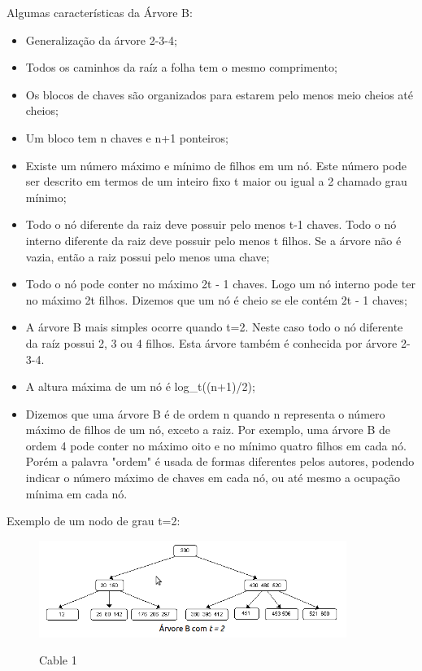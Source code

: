 \documentclass{article}
\begin{document}
Algumas características da Árvore B:

\begin{itemize}
   \item Generalização da árvore 2-3-4;
   \item Todos os caminhos da raíz a folha tem o mesmo comprimento;
   \item Os blocos de chaves são organizados para estarem pelo menos meio cheios até cheios;
   \item Um bloco tem n chaves e n+1 ponteiros;
   \item Existe um número máximo e mínimo de filhos em um nó. Este número pode ser descrito em
termos de um inteiro fixo t maior ou igual a 2 chamado grau mínimo; 
   \item Todo o nó diferente da raiz deve possuir pelo menos t-1 chaves. Todo o nó interno diferente
da raiz deve possuir pelo menos t filhos. Se a árvore não é vazia, então a raiz possui pelo menos
uma chave;
   \item Todo o nó pode conter no máximo 2t - 1 chaves. Logo um nó interno pode ter no máximo 2t
filhos. Dizemos que um nó é cheio se ele contém 2t - 1 chaves;
   \item A árvore B mais simples ocorre quando t=2. Neste caso todo o nó diferente da raíz possui 2,
3 ou 4 filhos. Esta árvore também é conhecida por árvore 2-3-4.
   \item A altura máxima de um nó  é log\_t((n+1)/2);
   \item Dizemos que uma árvore B é de ordem n quando n representa o número máximo de filhos de um
nó, exceto a raiz. Por exemplo, uma árvore B de ordem 4 pode conter no máximo oito e no mínimo
quatro filhos em cada nó. Porém a palavra "ordem" é usada de formas diferentes pelos autores,
podendo indicar o número máximo de chaves em cada nó, ou até mesmo a ocupação mínima em cada nó.
\end{itemize}

\newpage

Exemplo de um nodo de grau t=2:

\begin{figure}[h]
    \center
    \includegraphics[width=10cm]{imagens/arvb2.png}
    \label{cable}
    \caption{Cable 1}
\end{figure}
\end{document}
